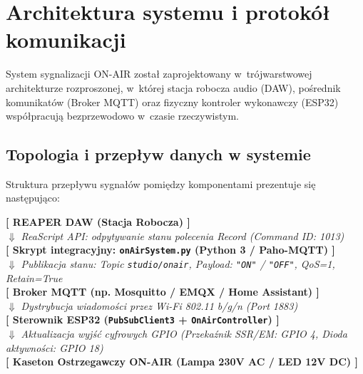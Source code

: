 \documentclass[11pt,a4paper]{article}
\begin{document}
\tableofcontents
\newpage

\section{Architektura systemu i protokół komunikacji}

System sygnalizacji ON-AIR został zaprojektowany w~trójwarstwowej architekturze rozproszonej, w~której stacja robocza audio (DAW), pośrednik komunikatów (Broker MQTT) oraz fizyczny kontroler wykonawczy (ESP32) współpracują bezprzewodowo w~czasie rzeczywistym.

\subsection{Topologia i przepływ danych w systemie}
Struktura przepływu sygnałów pomiędzy komponentami prezentuje się następująco:

\begin{center}
\begin{tcolorbox}[colback=boxBg,colframe=boxFrame,arc=3mm,width=0.95\textwidth]
\centering\small
\textbf{[ REAPER DAW (Stacja Robocza) ]}\\[1mm]
$\Downarrow$ \textit{ReaScript API: odpytywanie stanu polecenia Record (Command ID: 1013)}\\[1mm]
\textbf{[ Skrypt integracyjny: \texttt{onAirSystem.py} (Python 3 / Paho-MQTT) ]}\\[1mm]
$\Downarrow$ \textit{Publikacja stanu: Topic \texttt{studio/onair}, Payload: \texttt{"ON"} / \texttt{"OFF"}, QoS=1, Retain=True}\\[1mm]
\textbf{[ Broker MQTT (np. Mosquitto / EMQX / Home Assistant) ]}\\[1mm]
$\Downarrow$ \textit{Dystrybucja wiadomości przez Wi-Fi 802.11 b/g/n (Port 1883)}\\[1mm]
\textbf{[ Sterownik ESP32 (\texttt{PubSubClient3} + \texttt{OnAirController}) ]}\\[1mm]
$\Downarrow$ \textit{Aktualizacja wyjść cyfrowych GPIO (Przekaźnik SSR/EM: GPIO 4, Dioda aktywności: GPIO 18)}\\[1mm]
\textbf{[ Kaseton Ostrzegawczy ON-AIR (Lampa 230V AC / LED 12V DC) ]}
\end{tcolorbox}
\end{center}
\end{document}
